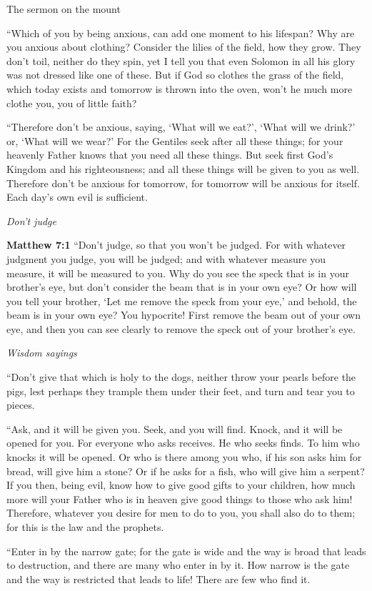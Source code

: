 \documentclass[10pt,twoside]{article} %
\newcommand{\quotesize}{\normalsize{}}
\newenvironment{quotetext}{\begingroup\quotesize}{\endgroup}
\newcommand{\bible}[2]{\begin{quotetext}\textbf{#1} #2\end{quotetext}}
\newcommand{\matthew}[2]{\bible{Matthew #1}{#2}}
\newcommand{\subhead}[1]{\emph{#1}\par}
\begin{document}
\begin{section}{The sermon on the mount}
{   ``Which of you by being anxious, can add one moment to his lifespan?    Why are you anxious about clothing? Consider the lilies of the field, how they grow. They don't toil, neither do they spin,    yet I tell you that even Solomon in all his glory was not dressed like one of these.    But if God so clothes the grass of the field, which today exists and tomorrow is thrown into the oven, won't he much more clothe you, you of little faith?

   ``Therefore don't be anxious, saying, `What will we eat?', `What will we drink?' or, `What will we wear?'    For the Gentiles seek after all these things; for your heavenly Father knows that you need all these things.    But seek first God's Kingdom and his righteousness; and all these things will be given to you as well.    Therefore don't be anxious for tomorrow, for tomorrow will be anxious for itself. Each day's own evil is sufficient. 
}

\subhead{Don't judge}

\matthew{7:1}{
    ``Don't judge, so that you won't be judged.    For with whatever judgment you judge, you will be judged; and with whatever measure you measure, it will be measured to you.    Why do you see the speck that is in your brother's eye, but don't consider the beam that is in your own eye?    Or how will you tell your brother, `Let me remove the speck from your eye,' and behold, the beam is in your own eye?    You hypocrite! First remove the beam out of your own eye, and then you can see clearly to remove the speck out of your brother's eye.

\subhead{Wisdom sayings}

   ``Don't give that which is holy to the dogs, neither throw your pearls before the pigs, lest perhaps they trample them under their feet, and turn and tear you to pieces.

   ``Ask, and it will be given you. Seek, and you will find. Knock, and it will be opened for you.    For everyone who asks receives. He who seeks finds. To him who knocks it will be opened.    Or who is there among you who, if his son asks him for bread, will give him a stone?    Or if he asks for a fish, who will give him a serpent?    If you then, being evil, know how to give good gifts to your children, how much more will your Father who is in heaven give good things to those who ask him!    Therefore, whatever you desire for men to do to you, you shall also do to them; for this is the law and the prophets.

   ``Enter in by the narrow gate; for the gate is wide and the way is broad that leads to destruction, and there are many who enter in by it.    How narrow is the gate and the way is restricted that leads to life! There are few who find it.

}
\end{section}
\end{document}
